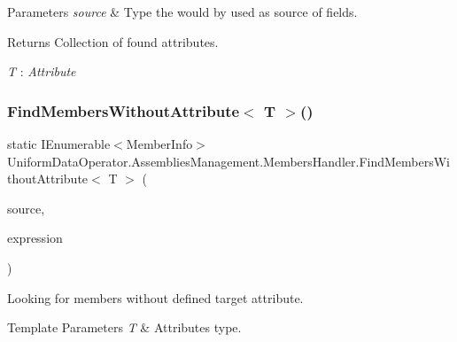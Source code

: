 \begin{DoxyParams}{Parameters}
{\em source} & Type the would by used as source of fields.\\
\hline
\end{DoxyParams}
\begin{DoxyReturn}{Returns}
Collection of found attributes.
\end{DoxyReturn}
\begin{Desc}
\item[Type Constraints]\begin{description}
\item[{\em T} : {\em Attribute}]\end{description}
\end{Desc}
\mbox{\label{class_uniform_data_operator_1_1_assemblies_management_1_1_members_handler_a1c637a7411bf34126f5ab90b130a3f04}} 
\subsubsection{\texorpdfstring{Find\+Members\+Without\+Attribute$<$ T $>$()}{FindMembersWithoutAttribute< T >()}\hspace{0.1cm}{\footnotesize\ttfamily [1/2]}}
{\footnotesize\ttfamily static I\+Enumerable$<$Member\+Info$>$ Uniform\+Data\+Operator.\+Assemblies\+Management.\+Members\+Handler.\+Find\+Members\+Without\+Attribute$<$ T $>$ (\begin{DoxyParamCaption}\item[{I\+Enumerable$<$ Member\+Info $>$}]{source,  }\item[{System.\+Func$<$ Member\+Info, bool $>$}]{expression }\end{DoxyParamCaption})\hspace{0.3cm}{\ttfamily [static]}}



Looking for members without defined target attribute. 


\begin{DoxyTemplParams}{Template Parameters}
{\em T} & Attribute\textquotesingle{}s type.\\
\hline
\end{DoxyTemplParams}

